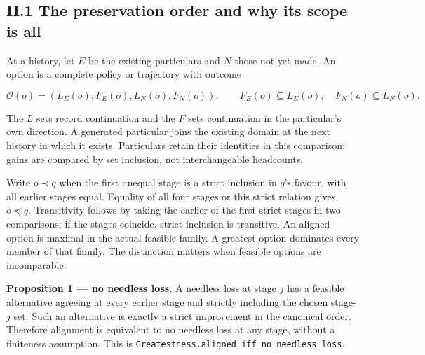 \documentclass[
]{article}
\begin{document}
\subsection{II.1 The preservation order and why its scope is
all}\label{ii.1-the-preservation-order-and-why-its-scope-is-all}

At a history, let \(E\) be the existing particulars and \(N\) those not
yet made. An option is a complete policy or trajectory with outcome

\[
\mathcal O(o)=(L_E(o),F_E(o),L_N(o),F_N(o)),
\qquad F_E(o)\subseteq L_E(o),\quad F_N(o)\subseteq L_N(o).
\]

The \(L\) sets record continuation and the \(F\) sets continuation in
the particular's own direction. A generated particular joins the
existing domain at the next history in which it exists. Particulars
retain their identities in this comparison: gains are compared by set
inclusion, not interchangeable headcounts.

Write \(o\prec q\) when the first unequal stage is a strict inclusion in
\(q\)'s favour, with all earlier stages equal. Equality of all four
stages or this strict relation gives \(o\preceq q\). Transitivity
follows by taking the earlier of the first strict stages in two
comparisons; if the stages coincide, strict inclusion is transitive. An
aligned option is maximal in the actual feasible family. A greatest
option dominates every member of that family. The distinction matters
when feasible options are incomparable.

\textbf{Proposition 1 --- no needless loss.} A needless loss at stage
\(j\) has a feasible alternative agreeing at every earlier stage and
strictly including the chosen stage-\(j\) set. Such an alternative is
exactly a strict improvement in the canonical order. Therefore alignment
is equivalent to no needless loss at any stage, without a finiteness
assumption. This is
\texttt{G\allowbreak{}r\allowbreak{}e\allowbreak{}a\allowbreak{}t\allowbreak{}e\allowbreak{}s\allowbreak{}t\allowbreak{}n\allowbreak{}e\allowbreak{}s\allowbreak{}s\allowbreak{}.\allowbreak{}a\allowbreak{}l\allowbreak{}i\allowbreak{}g\allowbreak{}n\allowbreak{}e\allowbreak{}d\allowbreak{}\_\allowbreak{}i\allowbreak{}f\allowbreak{}f\allowbreak{}\_\allowbreak{}n\allowbreak{}o\allowbreak{}\_\allowbreak{}n\allowbreak{}e\allowbreak{}e\allowbreak{}d\allowbreak{}l\allowbreak{}e\allowbreak{}s\allowbreak{}s\allowbreak{}\_\allowbreak{}l\allowbreak{}o\allowbreak{}s\allowbreak{}s}.
\end{document}
